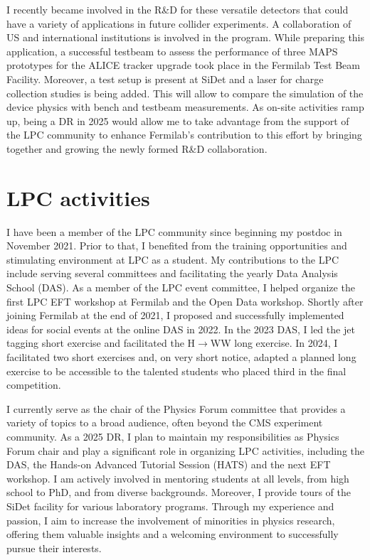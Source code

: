 {\begin{flushleft}
I recently became involved in the R\&D for these versatile detectors that could have a variety of applications in future collider experiments. A collaboration of US and international institutions is involved in the program. While preparing this application, a successful testbeam to assess the performance of three MAPS prototypes for the ALICE tracker upgrade took place in the Fermilab Test Beam Facility. Moreover, a test setup is present at SiDet and a laser for charge  collection studies is being added. This will allow to compare the simulation of the device physics with bench and testbeam measurements.
As on-site activities ramp up, being a DR in 2025 would allow me to take advantage from the support of the LPC community to enhance Fermilab's contribution to this effort by bringing together and growing the newly formed R\&D collaboration.

 
\section{LPC activities}
\vspace{\baselineskip}
I have been a member of the LPC community since beginning my postdoc in November 2021. Prior to that, I benefited from the training opportunities and stimulating environment at LPC as a student.
My contributions to the LPC include serving several committees and facilitating the yearly Data Analysis School (DAS). 
As a member of the LPC event committee, I helped organize the first LPC EFT workshop at Fermilab and the Open Data workshop. 
Shortly after joining Fermilab at the end of 2021, I proposed and successfully implemented ideas for social events at the online DAS in 2022.
In the 2023 DAS, I led the jet tagging short exercise and facilitated the H$\to$WW long exercise. In 2024, I facilitated two short exercises and, on very short notice, adapted a planned long exercise to be accessible to the talented students who placed third in the final competition.

I currently serve as the chair of the Physics Forum committee that provides a variety of topics to a broad audience, often beyond the CMS experiment community. As a 2025 DR, I plan to maintain my responsibilities as Physics Forum chair and play a significant role in organizing LPC activities, including the DAS, the Hands-on Advanced Tutorial Session (HATS) and the next EFT workshop. I am actively involved in mentoring students at all levels, from high school to PhD, and from diverse backgrounds. Moreover, I provide tours of the SiDet facility for various laboratory programs. Through my experience and passion, I aim to increase the involvement of minorities in physics research, offering them valuable insights and a welcoming environment to successfully pursue their interests.




\end{flushleft}}
